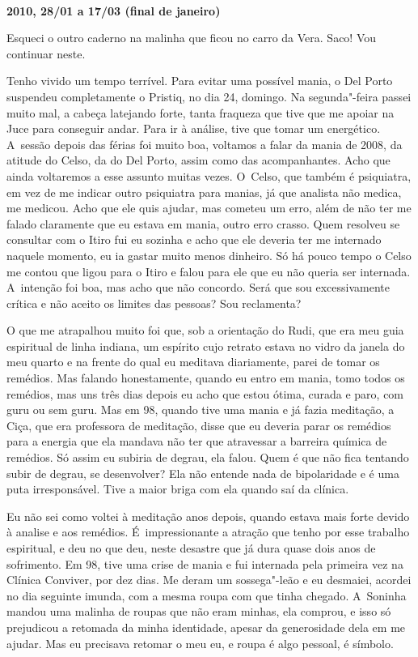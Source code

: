  

​

\begin{flushright}\textbf{2010, 28/01 a 17/03 (final de janeiro)}\end{flushright}


Esqueci o outro caderno na malinha que ficou no carro da Vera. Saco! Vou
continuar neste.

Tenho vivido um tempo terrível. Para evitar uma possível mania, o Del
Porto suspendeu completamente o Pristiq, no dia 24, domingo. Na
segunda"-feira passei muito mal, a cabeça latejando forte, tanta fraqueza
que tive que me apoiar na Juce para conseguir andar. Para ir à análise,
tive que tomar um energético. A~sessão depois das férias foi muito boa,
voltamos a falar da mania de 2008, da atitude do Celso, da do Del Porto,
assim como das acompanhantes. Acho que ainda voltaremos a esse assunto
muitas vezes. O~Celso, que também é psiquiatra, em vez de me indicar
outro psiquiatra para manias, já que analista não medica, me medicou.
Acho que ele quis ajudar, mas cometeu um erro, além de não ter me falado
claramente que eu estava em mania, outro erro crasso. Quem resolveu se
consultar com o Itiro fui eu sozinha e acho que ele deveria ter me
internado naquele momento, eu ia gastar muito menos dinheiro. Só há
pouco tempo o Celso me contou que ligou para o Itiro e falou para ele
que eu não queria ser internada. A~intenção foi boa, mas acho que não
concordo. Será que sou excessivamente crítica e não aceito os limites
das pessoas? Sou reclamenta?

O que me atrapalhou muito foi que, sob a orientação do Rudi, que era meu
guia espiritual de linha indiana, um espírito cujo retrato estava no
vidro da janela do meu quarto e na frente do qual eu meditava
diariamente, parei de tomar os remédios. Mas falando honestamente,
quando eu entro em mania, tomo todos os remédios, mas uns três dias
depois eu acho que estou ótima, curada e paro, com guru ou sem guru. Mas
em 98, quando tive uma mania e já fazia meditação, a Ciça, que era
professora de meditação, disse que eu deveria parar os remédios para a
energia que ela mandava não ter que atravessar a barreira química de
remédios. Só assim eu subiria de degrau, ela falou. Quem é que não fica
tentando subir de degrau, se desenvolver? Ela não entende nada de
bipolaridade e é uma puta irresponsável. Tive a maior briga com ela
quando saí da clínica.

Eu não sei como voltei à meditação anos depois, quando estava mais forte
devido à analise e aos remédios. É~impressionante a atração que tenho
por esse trabalho espiritual, e deu no que deu, neste desastre que já
dura quase dois anos de sofrimento. Em 98, tive uma crise de mania e fui
internada pela primeira vez na Clínica Conviver, por dez dias. Me deram
um sossega"-leão e eu desmaiei, acordei no dia seguinte imunda, com a
mesma roupa com que tinha chegado. A~Soninha mandou uma malinha de roupas
que não eram minhas, ela comprou, e isso só prejudicou a retomada da
minha identidade, apesar da generosidade dela em me ajudar. Mas eu
precisava retomar o meu eu, e roupa é algo pessoal, é símbolo.

